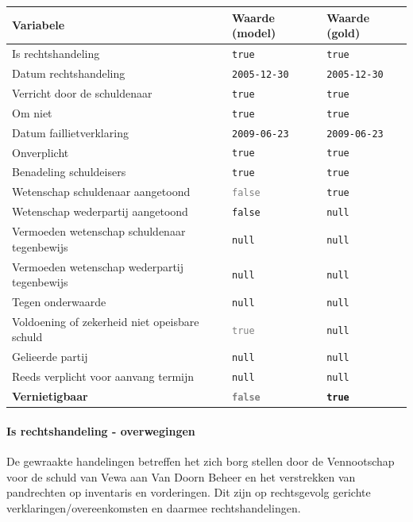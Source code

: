 \documentclass[
  dutch,
  a4paper,
]{article}
\begin{document}
\begin{center}
\small
\begin{tabular}{@{}p{7.4cm}p{2.6cm}p{2.6cm}@{}}
\toprule
Variabele & Waarde (model) & Waarde (gold) \\
\midrule
Is rechtshandeling & \texttt{true} & \texttt{true} \\
Datum rechtshandeling & \texttt{2005-12-30} & \texttt{2005-12-30} \\
Verricht door de schuldenaar & \texttt{true} & \texttt{true} \\
Om niet & \texttt{true} & \texttt{true} \\
Datum faillietverklaring & \texttt{2009-06-23} & \texttt{2009-06-23} \\
Onverplicht & \texttt{true} & \texttt{true} \\
Benadeling schuldeisers & \texttt{true} & \texttt{true} \\
Wetenschap schuldenaar aangetoond & \textcolor{gray}{\texttt{false}} & \texttt{true} \\
Wetenschap wederpartij aangetoond & \texttt{false} & \texttt{null} \\
Vermoeden wetenschap schuldenaar tegenbewijs & \texttt{null} & \texttt{null} \\
Vermoeden wetenschap wederpartij tegenbewijs & \texttt{null} & \texttt{null} \\
Tegen onderwaarde & \texttt{null} & \texttt{null} \\
Voldoening of zekerheid niet opeisbare schuld & \textcolor{gray}{\texttt{true}} & \texttt{null} \\
Gelieerde partij & \texttt{null} & \texttt{null} \\
Reeds verplicht voor aanvang termijn & \texttt{null} & \texttt{null} \\
\textbf{Vernietigbaar} & \textbf{\textcolor{gray}{\texttt{false}}} & \textbf{\texttt{true}} \\
\bottomrule
\end{tabular}
\end{center}

\paragraph{Is rechtshandeling - overwegingen}\label{is-rechtshandeling---overwegingen-4}

De gewraakte handelingen betreffen het zich borg stellen door de Vennootschap voor de schuld van Vewa aan Van Doorn Beheer en het verstrekken van pandrechten op inventaris en vorderingen. Dit zijn op rechtsgevolg gerichte verklaringen/overeenkomsten en daarmee rechtshandelingen.
\end{document}
